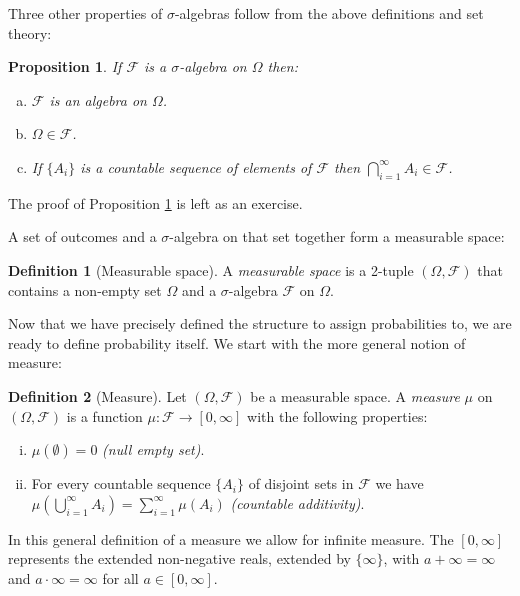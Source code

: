 \documentclass{book}
\theoremstyle{plain}%
\newtheorem{proposition}{Proposition}[section]
\theoremstyle{definition}
\newtheorem{definition}{Definition}[section]
\newlength{\arrow}
\begin{document}
Three other properties of $\sigma$-algebras follow from the above definitions and set theory:

\begin{proposition}
If $\mathcal{F}$ is a $\sigma$-algebra on $\Omega$ then:
\begin{enumerate}[(a)]
\item $\mathcal{F}$ is an algebra on $\Omega$.
\item  $\Omega \in \mathcal{F}$.
\item If $\{A_i\}$ is a countable sequence of elements of $\mathcal{F}$ then $\bigcap_{i=1}^\infty A_i \in \mathcal{F}$.
\end{enumerate}\label{prop:001}
\end{proposition}

The proof of Proposition \ref{prop:001} is left as an exercise.

A set of outcomes and a $\sigma$-algebra on that set together form a measurable space:

\begin{definition}[Measurable space]
A \emph{measurable space} is a 2-tuple $(\Omega, \mathcal{F})$ that contains a non-empty set $\Omega$ and a $\sigma$-algebra $\mathcal{F}$ on $\Omega$.
\end{definition}

Now that we have precisely defined the structure to assign probabilities to, we are ready to define probability itself. We start with the more general notion of measure:

\begin{definition}[Measure]
Let $(\Omega, \mathcal{F})$  be a measurable space. A \emph{measure} $\mu$ on $(\Omega, \mathcal{F})$ is a function $\mu: \mathcal{F} \rightarrow [0, \infty]$ with the following properties:
\begin{enumerate}[(i)]
\item $\mu(\emptyset) = 0$ \emph{(null empty set)}.
\item For every countable sequence $\{A_i\}$ of disjoint sets in $\mathcal{F}$ we have $\mu(\bigcup_{i=1}^\infty A_i) = \sum_{i=1}^\infty \mu(A_i)$ \emph{(countable additivity)}.
\end{enumerate}
\end{definition}

In this general definition of a measure we allow for infinite measure. The $[0, \infty]$ represents the extended non-negative reals, extended by $\{\infty\}$, with $a + \infty = \infty$ and $a \cdot \infty = \infty$ for all $a \in [0, \infty]$.
\end{document}
